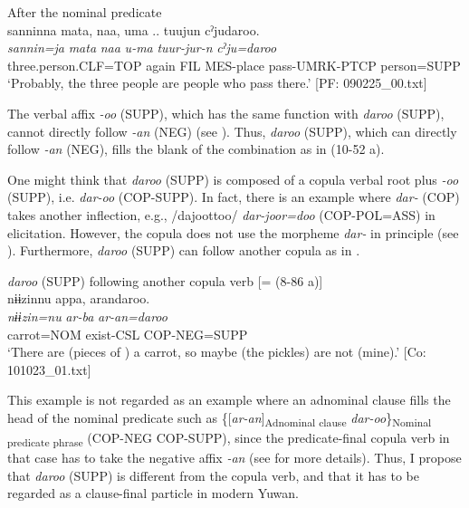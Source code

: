 \begin{xlist}
  \ex After the nominal predicate\\
      \glll    {\textbar}sannin{\textbar}na  mata,  naa,  uma ..  tuujun  cˀjudaroo.\\
    \textit{sannin=ja}  \textit{mata}  \textit{naa}  \textit{u-ma}  \textit{tuur-jur-n} \textit{cˀju=daroo}\\
    three.person.CLF=TOP  again  FIL  MES-place  pass-UMRK-PTCP  person=SUPP  \\
    \glt     ‘Probably, the three people are people who pass there.’   [PF: 090225\_00.txt]
\z
\z

The verbal affix \textit{{}-oo} (SUPP), which has the same function with \textit{daroo} (SUPP), cannot directly follow \textit{{}-an} (NEG) (see ). Thus, \textit{daroo} (SUPP), which can directly follow \textit{-an} (NEG), fills the blank of the combination as in (10-52 a).

  One might think that \textit{daroo} (SUPP) is composed of a copula verbal root plus \textit{{}-oo} (SUPP), i.e. \textit{dar-oo} (COP-SUPP). In fact, there is an example where \textit{dar-} (COP) takes another inflection, e.g., /dajoottoo/ \textit{dar-joor=doo} (COP-POL=ASS) in elicitation. However, the copula does not use the morpheme \textit{dar-} in principle (see ). Furthermore, \textit{daroo} (SUPP) can follow another copula as in .

\ea\label{ex:10.53}   \textit{daroo} (SUPP) following another copula verb [= (8-86 a)]\\
      \glll    nɨɨzinnu  appa,  arandaroo.\\
    \textit{nɨɨzin=nu}  \textit{ar-ba}  \textit{ar{}-an=daroo}\\
    carrot=NOM  exist-CSL  COP-NEG=SUPP\\
\glt     ‘There are (pieces of ) a carrot, so maybe (the pickles) are not (mine).’  [Co: 101023\_01.txt]
\z

This example is not regarded as an example where an adnominal clause fills the head of the nominal predicate such as \{[\textit{ar-an}]\textsubscript{Adnominal clause} \textit{dar-oo}\}\textsubscript{Nominal predicate phrase} (COP-NEG COP-SUPP), since the predicate-final copula verb in that case has to take the negative affix \textit{-an} (see  for more details). Thus, I propose that \textit{daroo} (SUPP) is different from the copula verb, and that it has to be regarded as a clause-final particle in modern Yuwan.


\end{xlist}
